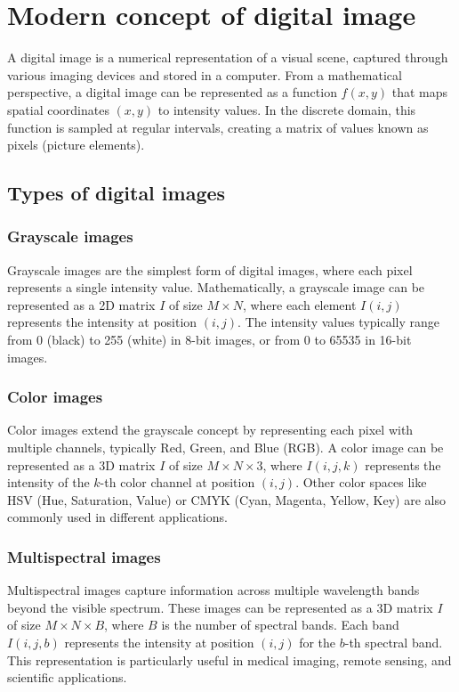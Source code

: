 \section{Modern concept of digital image}

A digital image is a numerical representation of a visual scene,
captured through various imaging devices and stored in a computer.
From a mathematical perspective, a digital image can be represented
as a function $f(x,y)$ that maps spatial coordinates $(x,y)$ to
intensity values. In the discrete domain, this function is sampled at
regular intervals, creating a matrix of values known as pixels
(picture elements).

\subsection{Types of digital images}

\subsubsection{Grayscale images}
Grayscale images are the simplest form of digital images, where each
pixel represents a single intensity value. Mathematically, a
grayscale image can be represented as a 2D matrix $I$ of size $M
\times N$, where each element $I(i,j)$ represents the intensity at
position $(i,j)$. The intensity values typically range from 0 (black)
to 255 (white) in 8-bit images, or from 0 to 65535 in 16-bit images.

\subsubsection{Color images}
Color images extend the grayscale concept by representing each pixel
with multiple channels, typically Red, Green, and Blue (RGB). A color
image can be represented as a 3D matrix $I$ of size $M \times N
\times 3$, where $I(i,j,k)$ represents the intensity of the $k$-th
color channel at position $(i,j)$. Other color spaces like HSV (Hue,
Saturation, Value) or CMYK (Cyan, Magenta, Yellow, Key) are also
commonly used in different applications.

\subsubsection{Multispectral images}
Multispectral images capture information across multiple wavelength
bands beyond the visible spectrum. These images can be represented as
a 3D matrix $I$ of size $M \times N \times B$, where $B$ is the
number of spectral bands. Each band $I(i,j,b)$ represents the
intensity at position $(i,j)$ for the $b$-th spectral band. This
representation is particularly useful in medical imaging, remote
sensing, and scientific applications.

